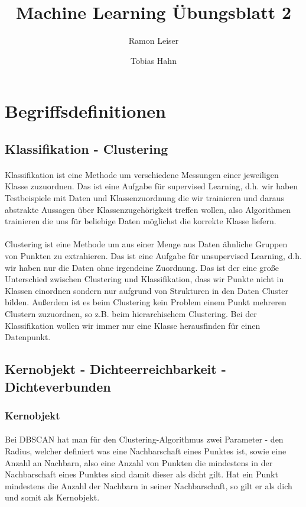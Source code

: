 \documentclass[a4paper]{article}
\title{Machine Learning Übungsblatt 2}
\author{Ramon Leiser\and Tobias Hahn}
\begin{document}
\maketitle
\newpage
\section{Begriffsdefinitionen}
\subsection{Klassifikation - Clustering}
\paragraph{}
Klassifikation ist eine Methode um verschiedene Messungen einer jeweiligen Klasse zuzuordnen. Das ist eine Aufgabe für supervised Learning, d.h. wir haben Testbeispiele mit Daten und Klassenzuordnung die wir trainieren und daraus abstrakte Aussagen über Klassenzugehörigkeit treffen wollen, also Algorithmen trainieren die uns für beliebige Daten möglichst die korrekte Klasse liefern.
\paragraph{}
Clustering ist eine Methode um aus einer Menge aus Daten ähnliche Gruppen von Punkten zu extrahieren. Das ist eine Aufgabe für unsupervised Learning, d.h. wir haben nur die Daten ohne irgendeine Zuordnung. Das ist der eine große Unterschied zwischen Clustering und Klassifikation, dass wir Punkte nicht in Klassen einordnen sondern nur aufgrund von Strukturen in den Daten Cluster bilden. Außerdem ist es beim Clustering kein Problem einem Punkt mehreren Clustern zuzuordnen, so z.B. beim hierarchischem Clustering. Bei der Klassifikation wollen wir immer nur eine Klasse herausfinden für einen Datenpunkt.
\subsection{Kernobjekt - Dichteerreichbarkeit - Dichteverbunden}
\subsubsection{Kernobjekt}
\paragraph{}
Bei DBSCAN hat man für den Clustering-Algorithmus zwei Parameter - den Radius, welcher definiert was eine Nachbarschaft eines Punktes ist, sowie eine Anzahl an Nachbarn, also eine Anzahl von Punkten die mindestens in der Nachbarschaft eines Punktes sind damit dieser als dicht gilt. Hat ein Punkt mindestens die Anzahl der Nachbarn in seiner Nachbarschaft, so gilt er als dich und somit als Kernobjekt.
\end{document}
